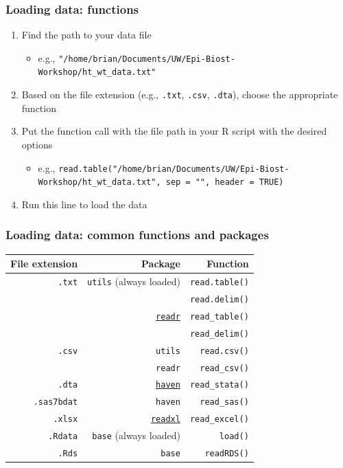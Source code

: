 \documentclass[11pt,dvipsnames]{beamer}
\newcommand{\myframe}[1]{\begin{frame} \frametitle{#1}}
\begin{document}
\myframe{Loading data: functions}
\begin{enumerate}
\item Find the path to your data file 
\begin{itemize}
\item {\scriptsize e.g., \texttt{"/home/brian/Documents/UW/Epi-Biost-Workshop/ht\_wt\_data.txt"} }
\end{itemize}
\item Based on the file extension (e.g., \texttt{.txt}, \texttt{.csv}, \texttt{.dta}), choose the appropriate function
\item Put the function call with the file path in your R script with the desired options
\begin{itemize}
\item {\tiny e.g., \texttt{read.table("/home/brian/Documents/UW/Epi-Biost-Workshop/ht\_wt\_data.txt", sep = "", header = TRUE)} }
\end{itemize}
\item Run this line to load the data
\end{enumerate}
\end{frame}

\myframe{Loading data: common functions and packages}
\begin{tabular}{rrr}
File extension & Package & Function \\
\hline 
\texttt{.txt} & \texttt{utils} (always loaded)  & \texttt{read.table()} \\
              &                & \texttt{read.delim()} \\
              & \href{http://readr.tidyverse.org/}{\texttt{readr}} & \texttt{read\_table()} \\
              &                & \texttt{read\_delim()} \\
\texttt{.csv} & \texttt{utils}  & \texttt{read.csv()} \\
              & \texttt{readr} & \texttt{read\_csv()} \\
\texttt{.dta} & \href{http://haven.tidyverse.org/}{\texttt{haven}} & \texttt{read\_stata()} \\
\texttt{.sas7bdat} & \texttt{haven} & \texttt{read\_sas()} \\
\texttt{.xlsx} & \href{http://readxl.tidyverse.org/}{\texttt{readxl}} & \texttt{read\_excel()} \\
\texttt{.Rdata} & \texttt{base} (always loaded) & \texttt{load()} \\
\texttt{.Rds} & \texttt{base} & \texttt{readRDS()} \\
\hline
\end{tabular}
\end{frame}
\end{document}
